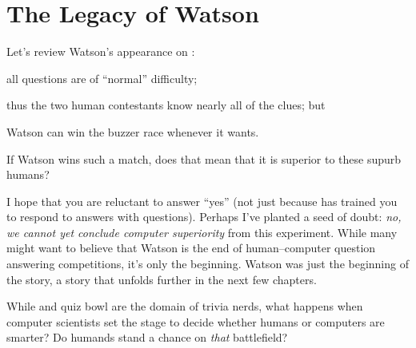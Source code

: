 
\section{The Legacy of Watson}


Let's review Watson's appearance on \jeopardyp{}:
\begin{enumerate*}
        \item all questions are of ``normal'' difficulty;
        \item thus the two human contestants know nearly all of the clues; but
        \item Watson can win the buzzer race whenever it wants.
\end{enumerate*}
If Watson wins such a match, does that mean that it is superior to
these supurb humans?

I hope that you are reluctant to answer ``yes'' (not just
because \jeopardy{} has trained you to respond to answers with
questions).
%
Perhaps I've planted a seed of doubt: \emph{no, we cannot yet conclude
  computer superiority} from this experiment.
%
While many might want to believe that Watson is the end of
human--computer question answering competitions, it's only the
beginning.
%
Watson was just the beginning of the story, a story that unfolds
further in the next few chapters.

While \jeopardy{} and quiz bowl are the domain of trivia nerds, what
happens when computer scientists set the stage to decide whether
humans or computers are smarter?
%
Do humands stand a chance on \emph{that} battlefield?

